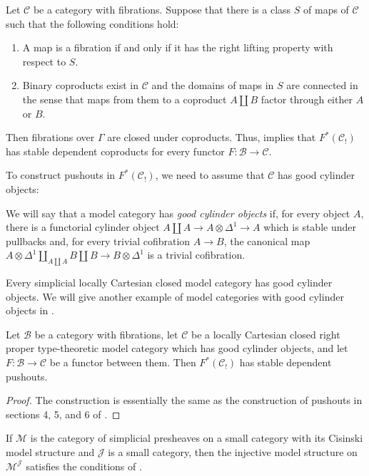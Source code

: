 \documentclass[reqno]{amsart}
\theoremstyle{definition}
\theoremstyle{remark}
\newcommand{\scat}[1]{\mathcal{#1}}
\numberwithin{figure}{section}
\begin{document}
\begin{example}
Let $\scat{C}$ be a category with fibrations.
Suppose that there is a class $S$ of maps of $\scat{C}$ such that the following conditions hold:
\begin{enumerate}
\item A map is a fibration if and only if it has the right lifting property with respect to $S$.
\item Binary coproducts exist in $\scat{C}$ and the domains of maps in $S$ are connected in the sense that maps from them to a coproduct $A \amalg B$ factor through either $A$ or $B$.
\end{enumerate}
Then fibrations over $\Gamma$ are closed under coproducts.
Thus,  implies that $F^*(\scat{C}_!)$ has stable dependent coproducts for every functor $F : \scat{B} \to \scat{C}$.
\end{example}

To construct pushouts in $F^*(\scat{C}_!)$, we need to assume that $\scat{C}$ has good cylinder objects:

\begin{defn}
We will say that a model category has \emph{good cylinder objects} if, for every object $A$, there is a functorial cylinder object $A \amalg A \to A \otimes \Delta^1 \to A$ which is stable under pullbacks and,
for every trivial cofibration $A \to B$, the canonical map $A \otimes \Delta^1 \amalg_{A \amalg A} B \amalg B \to B \otimes \Delta^1$ is a trivial cofibration.
\end{defn}

Every simplicial locally Cartesian closed model category has good cylinder objects.
We will give another example of model categories with good cylinder objects in .

\begin{prop}[pushouts]
Let $\scat{B}$ be a category with fibrations, let $\scat{C}$ be a locally Cartesian closed right proper type-theoretic model category which has good cylinder objects, and let $F : \scat{B} \to \scat{C}$ be a functor between them.
Then $F^*(\scat{C}_!)$ has stable dependent pushouts.
\end{prop}
\begin{proof}
The construction is essentially the same as the construction of pushouts in sections 4, 5, and 6 of \cite{lum-shul-hits}.
\end{proof}

\begin{example}
If $\scat{M}$ is the category of simplicial presheaves on a small category with its Cisinski model structure \cite{cisinski-presheaf,cisinski} and $\scat{J}$ is a small category,
then the injective model structure on $\scat{M}^\scat{J}$ satisfies the conditions of .
\end{example}
\end{document}

